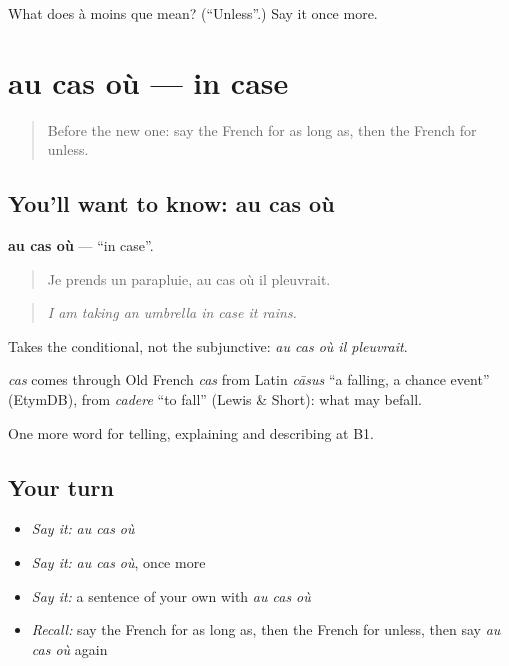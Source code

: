 \begin{tcolorbox}[breakable,colback=teal!4,colframe=teal!35!black,title={Before you move on}]
What does à moins que mean? (\textquotedblleft{}Unless\textquotedblright{}.) Say it once more.
\end{tcolorbox}
\section[au cas où]{au cas où — in case}

\label{lesson:FR-C368-au-cas-ou}



\begin{quote}
Before the new one: say the French for as long as, then the French for unless.
\end{quote}

\subsection*{You'll want to know: au cas où}
\textbf{au cas où} — \textquotedblleft{}in case\textquotedblright{}.

\begin{quote}
Je prends un parapluie, au cas où il pleuvrait.
\end{quote}

\begin{quote}
\emph{I am taking an umbrella in case it rains.}
\end{quote}

Takes the conditional, not the subjunctive: \emph{au cas où il pleuvrait}.

\begin{cousinweb}
\emph{cas} comes through Old French \emph{cas} from Latin \emph{cāsus} \textquotedblleft{}a falling, a chance event\textquotedblright{} (EtymDB), from \emph{cadere} \textquotedblleft{}to fall\textquotedblright{} (Lewis \& Short): what may befall.
\end{cousinweb}

\begin{grammarlens}[title={What you've built}]
One more word for telling, explaining and describing at B1.
\end{grammarlens}

\subsection*{Your turn}
\begin{itemize}
\raggedright
  \item \emph{Say it:} \emph{au cas où}
  \item \emph{Say it:} \emph{au cas où}, once more
  \item \emph{Say it:} a sentence of your own with \emph{au cas où}
  \item \emph{Recall:} say the French for as long as, then the French for unless, then say \emph{au cas où} again
\end{itemize}


